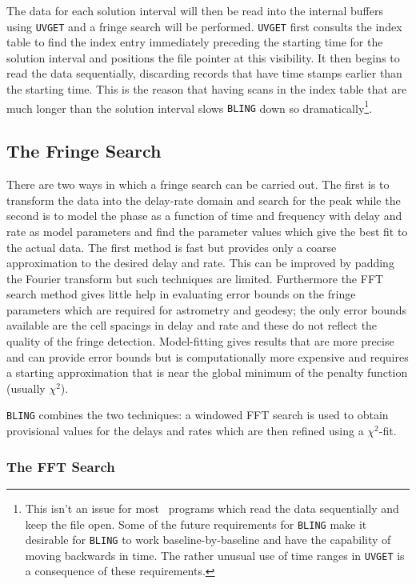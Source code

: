 The data for each solution interval will then be read into the
internal buffers using {\tt UVGET} and a fringe search will be
performed.  {\tt UVGET} first consults the index table to find the
index entry immediately preceding the starting time for the solution
interval and positions the file pointer at this visibility.  It then
begins to read the data sequentially, discarding records that have
time stamps earlier than the starting time.  This is the reason that
having scans in the index table that are much longer than the solution
interval slows {\tt BLING} down so dramatically\footnote{This isn't an
issue for most \AIPS\ programs which read the data sequentially and
keep the file open.  Some of the future requirements for {\tt BLING}
make it desirable for {\tt BLING} to work baseline-by-baseline and
have the capability of moving backwards in time.  The rather unusual
use of time ranges in {\tt UVGET} is a consequence of these
requirements.}.

\subsection{The Fringe Search}

There are two ways in which a fringe search can be carried out.  The
first is to transform the data into the delay-rate domain and search
for the peak while the second is to model the phase as a function of
time and frequency with delay and rate as model parameters and find
the parameter values which give the best fit to the actual data.  The
first method is fast but provides only a coarse approximation to the
desired delay and rate.  This can be improved by padding the Fourier
transform but such techniques are limited.  Furthermore the FFT search
method gives little help in evaluating error bounds on the fringe
parameters which are required for astrometry and geodesy;  the only
error bounds available are the cell spacings in delay and rate and
these do not reflect the quality of the fringe detection.
Model-fitting gives results that are more precise and can provide
error bounds but is computationally more expensive and requires a
starting approximation that is near the global minimum of the penalty
function (usually $\chi^2$).

{\tt BLING} combines the two techniques: a windowed FFT search is
used to obtain provisional values for the delays and rates which are
then refined using a $\chi^2$-fit.

\subsubsection{The FFT Search}


